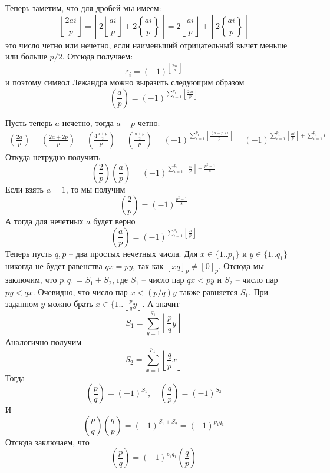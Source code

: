 \documentclass{article}
\begin{document}
\begin{enumerate}
        Теперь заметим, что для дробей мы имеем:
        \[
            \left\lfloor\frac{2ai}{p}\right\rfloor=
            \left\lfloor2\left\lfloor\frac{ai}{p}\right\rfloor+2\left\{
                \frac{ai}{p}\right\}\right\rfloor=
            2\left\lfloor\frac{ai}{p}\right\rfloor+\left\lfloor2\left\{\frac{ai}{p}
            \right\}\right\rfloor
        \]
        это число четно или нечетно, если наименьший отрицательный вычет меньше
        или больше $p/2$. Отсюда получаем:
        \[
            \varepsilon_i=(-1)^{\left\lfloor\frac{2ai}{p}\right\rfloor}
        \]
        и поэтому символ Лежандра можно выразить следующим образом
        \[
            \left(\frac{a}{p}\right)=(-1)^{\sum_{i=1}^{p_1}\left\lfloor\frac{2ai}
            {p}\right\rfloor}
        \]

        Пусть теперь $a$ нечетно, тогда $a+p$ четно:
        \begin{align*}
            \left(\frac{2a}{p}\right)=\left(\frac{2a+2p}{p}\right)=\left(
            \frac{4\frac{a+p}{2}}{p}\right)=\left(\frac{\frac{a+p}{2}}{p}\right)
            =(-1)^{\sum_{i=1}^{p_1}\left\lfloor\frac{(a+p)i}{p}\right\rfloor}
            =(-1)^{\sum_{i=1}^{p_1}\left\lfloor\frac{ai}{p}\right\rfloor+\sum_{i=1}^{p_1}
            i}
        \end{align*}
        Откуда нетрудно получить
        \[
            \left(\frac{2}{p}\right)\left(\frac{a}{p}\right)=
            (-1)^{\sum_{i=1}^{p_1}\left\lfloor\frac{ai}{p}\right\rfloor+
            \frac{p^2-1}{8}}
        \]
        Если взять $a=1$, то мы получим
        \[
            \left(\frac{2}{p}\right)=(-1)^{\frac{p^2-1}{8}}
        \]
        А тогда для нечетных $a$ будет верно
        \[
            \left(\frac{a}{p}\right)=(-1)^{\sum_{i=1}^{p_1}\left\lfloor\frac{ai}{p}\right\rfloor}
        \]
        Теперь пусть $q,p$ – два простых нечетных числа. Для $x\in\{1..p_1\}$ и
        $y\in\{1..q_1\}$ никогда не будет равенства $qx=py$, так как $[xq]_p
        \neq[0]_p$. Отсюда мы заключим, что $p_1q_1=S_1+S_2$, где $S_1$ – число
        пар $qx<py$ и $S_2$ – число пар $py<qx$. Очевидно, что число пар $x<(p/q)y$
        также равняется $S_1$. При заданном $y$ можно брать $x\in\{1..\left\lfloor
        \frac{p}{q}y\right\rfloor$. А значит
        \[S_1=\sum_{y=1}^{q_1}\left\lfloor\frac{p}{q}y\right\rfloor\]
        Аналогично получим
        \[S_2=\sum_{x=1}^{p_1}\left\lfloor\frac{q}{p}x\right\rfloor\]
        Тогда
        \[\left(\frac{p}{q}\right)=(-1)^{S_1},\quad\left(\frac{q}{p}\right)=(-1)^{S_2}\]
        И
        \[\left(\frac{p}{q}\right)\left(\frac{q}{p}\right)=(-1)^{S_1+S_2}=(-1)^{p_1q_1}\]
        Отсюда заключаем, что
        \[\left(\frac{p}{q}\right)=(-1)^{p_1q_1}\left(\frac{q}{p}\right)\]
        

\end{enumerate}
\end{document}
